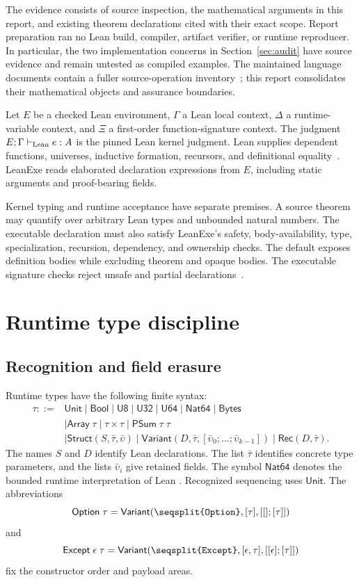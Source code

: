 \documentclass[11pt]{article}
\newcommand{\code}[1]{\texttt{\seqsplit{#1}}}
\newcommand{\ty}[1]{\mathsf{#1}}
\begin{document}
The evidence consists of source inspection, the mathematical arguments in this report, and existing theorem declarations cited with their exact scope.  Report preparation ran no Lean build, compiler, artifact verifier, or runtime reproducer.  In particular, the two implementation concerns in Section~\ref{sec:audit} have source evidence and remain untested as compiled examples.  The maintained language documents contain a fuller source-operation inventory~\cite{typetheory,specification}; this report consolidates their mathematical objects and assurance boundaries.

Let $E$ be a checked Lean environment, $\Gamma$ a Lean local context, $\Delta$ a runtime-variable context, and $\Xi$ a first-order function-signature context.  The judgment $E;\Gamma\vdash_{\rm Lean} e:A$ is the pinned Lean kernel judgment.  Lean supplies dependent functions, universes, inductive formation, recursors, and definitional equality~\cite{lean}.  LeanExe reads elaborated declaration expressions from $E$, including static arguments and proof-bearing fields.

Kernel typing and runtime acceptance have separate premises.  A source theorem may quantify over arbitrary Lean types and unbounded natural numbers.  The executable declaration must also satisfy LeanExe's safety, body-availability, type, specialization, recursion, dependency, and ownership checks.  The default \code{ConstantInfo.value?} exposes definition bodies while excluding theorem and opaque bodies.  The executable signature checks reject unsafe and partial declarations~\cite{types,extract}.

\section{Runtime type discipline}

\subsection{Recognition and field erasure}

Runtime types have the following finite syntax:
\begin{align*}
\tau ::= {}&\ty{Unit}\mid\ty{Bool}\mid\ty{U8}\mid\ty{U32}\mid\ty{U64}
       \mid\ty{Nat64}\mid\ty{Bytes}\\
 &\mid\ty{Array}\;\tau\mid\tau\times\tau\mid\ty{PSum}\;\tau\;\tau\\
 &\mid\ty{Struct}(S,\bar\tau,\bar\upsilon)
  \mid\ty{Variant}(D,\bar\tau,[\bar\upsilon_0;\ldots;\bar\upsilon_{k-1}])
  \mid\ty{Rec}(D,\bar\tau).
\end{align*}
The names $S$ and $D$ identify Lean declarations.  The list $\bar\tau$ identifies concrete type parameters, and the lists $\bar\upsilon_i$ give retained fields.  The symbol $\ty{Nat64}$ denotes the bounded runtime interpretation of Lean \code{Nat}.  Recognized \code{PUnit} sequencing uses $\ty{Unit}$.  The abbreviations
\[
\ty{Option}\;\tau=\ty{Variant}(\code{Option},[\tau],[[];[\tau]])
\]
and
\[
\ty{Except}\;\epsilon\;\tau
=\ty{Variant}(\code{Except},[\epsilon,\tau],[[\epsilon];[\tau]])
\]
fix the constructor order and payload areas.
\end{document}

